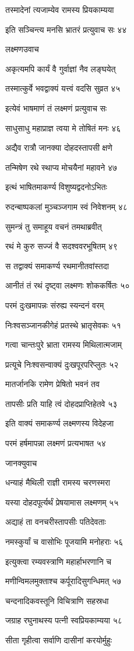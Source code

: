 तस्मादेनां त्यजाम्येव रामस्य प्रियकाम्यया

इति सञ्चिन्त्य मनसि भ्रातरं प्रत्युवाच सः ४४

लक्ष्मणउवाच

अकृत्यमपि कार्यं वै गुर्वाज्ञां नैव लङ्घयेत्

तस्मात्कुर्वे भवद्वाक्यं यत्त्वं वदसि सुव्रत ४५

इत्येवं भाषमाणं तं लक्ष्मणं प्रत्युवाच सः

साधुसाधु महाप्राज्ञ त्वया मे तोषितं मनः ४६

अद्यैव रात्रौ जानक्या दोहदस्तापसी क्षणे

तन्मिषेण रथे स्थाप्य मोचयैनां महावने ४७

इत्थं भाषितमाकर्ण्य विशुष्यद्वदनोऽभितः

रुदन्बाष्पकलां मुञ्चञ्जगाम स्वं निवेशनम् ४८

सुमन्त्रं तु समाहूय वचनं तमथाब्रवीत्

रथं मे कुरु सज्जं वै सदश्ववरभूषितम् ४९

स तद्वाक्यं समाकर्ण्य रथमानीतवांस्तदा

आनीतं तं रथं दृष्ट्वा लक्ष्मणः शोककर्षितः ५०

परमं दुःखमापन्नः संरुह्य स्यन्दनं वरम्

निःश्वसञ्जानकीगेहं प्रतस्थे भ्रातृसेवकः ५१

गत्वा चान्तःपुरे भ्राता रामस्य मिथिलात्मजाम्

प्रत्यूचे निःश्वसन्वाक्यं दुःखपूरपरिप्लुतः ५२

मातर्जानकि रामेण प्रेषितो भवनं तव

तापसीः प्रति याहि त्वं दोहदप्राप्तिहेतवे ५३

इति वाक्यं समाकर्ण्य लक्ष्मणस्य विदेहजा

परमं हर्षमापन्ना लक्ष्मणं प्रत्यभाषत ५४

जानक्युवाच

धन्याहं मैथिली राज्ञी रामस्य चरणस्मरा

यस्या दोहदपूर्त्यर्थं प्रेषयामास लक्ष्मणम् ५५

अद्याहं ता वनचरीस्तापसीः पतिदेवताः

नमस्कुर्यां च वासोभिः पूजयामि मनोहराः ५६

इत्युक्त्वा रम्यवस्त्राणि महार्हाभरणानि च

मणीन्विमलमुक्ताश्च कर्पूरादिसुगन्धिमत् ५७

चन्दनादिकवस्तूनि विचित्राणि सहस्रधा

जग्राह रघुनाथस्य पत्नी स्वप्रियकाम्यया ५८

सीता गृहीत्वा सर्वाणि दासीनां करयोर्मुहुः

